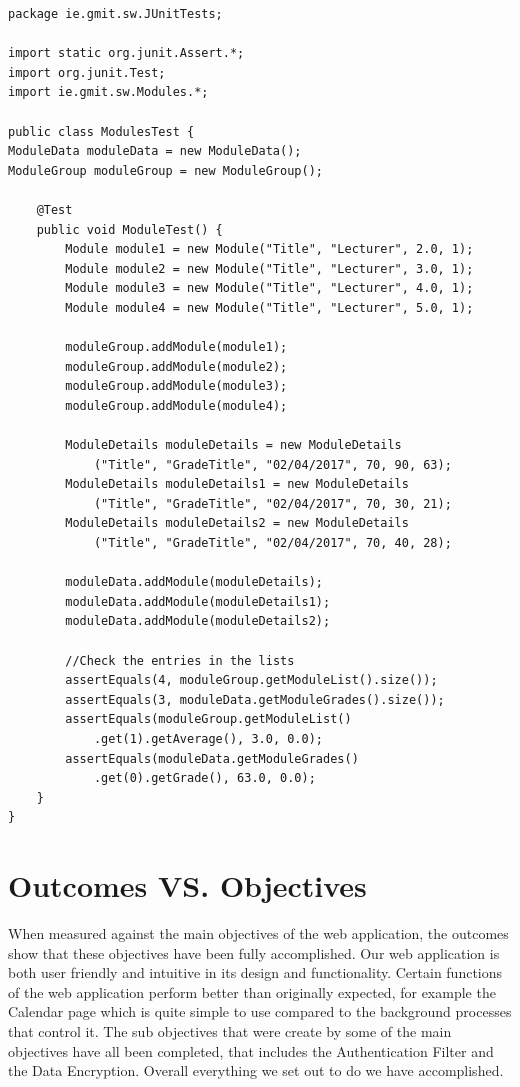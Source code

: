 \begin{verbatim}
package ie.gmit.sw.JUnitTests;

import static org.junit.Assert.*;
import org.junit.Test;
import ie.gmit.sw.Modules.*;

public class ModulesTest {
ModuleData moduleData = new ModuleData();
ModuleGroup moduleGroup = new ModuleGroup();

    @Test
    public void ModuleTest() {
        Module module1 = new Module("Title", "Lecturer", 2.0, 1);
        Module module2 = new Module("Title", "Lecturer", 3.0, 1);
        Module module3 = new Module("Title", "Lecturer", 4.0, 1);
        Module module4 = new Module("Title", "Lecturer", 5.0, 1);
        
        moduleGroup.addModule(module1);
        moduleGroup.addModule(module2);
        moduleGroup.addModule(module3);
        moduleGroup.addModule(module4);
        
        ModuleDetails moduleDetails = new ModuleDetails
            ("Title", "GradeTitle", "02/04/2017", 70, 90, 63);
        ModuleDetails moduleDetails1 = new ModuleDetails
            ("Title", "GradeTitle", "02/04/2017", 70, 30, 21);
        ModuleDetails moduleDetails2 = new ModuleDetails
            ("Title", "GradeTitle", "02/04/2017", 70, 40, 28);
        
        moduleData.addModule(moduleDetails);
        moduleData.addModule(moduleDetails1);
        moduleData.addModule(moduleDetails2);
        
        //Check the entries in the lists
        assertEquals(4, moduleGroup.getModuleList().size());
        assertEquals(3, moduleData.getModuleGrades().size());
        assertEquals(moduleGroup.getModuleList()
            .get(1).getAverage(), 3.0, 0.0);
        assertEquals(moduleData.getModuleGrades()
            .get(0).getGrade(), 63.0, 0.0);
    }
}
\end{verbatim}

\section{Outcomes VS. Objectives}
When measured against the main objectives of the web application, the outcomes show that these objectives have been fully accomplished. Our web application is both user friendly and intuitive in its design and functionality. Certain functions of the web application perform better than originally expected, for example the Calendar page which is quite simple to use compared to the background processes that control it. The sub objectives that were create by some of the main objectives have all been completed, that includes the Authentication Filter and the Data Encryption. Overall everything we set out to do we have accomplished.

